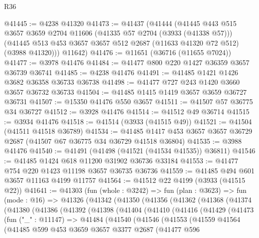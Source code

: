 \begin{lexlean}{R36}
\begin{coremodule}
@41445 := @4238 @41320
@41473 := @41437
    (@41444
      (@41445
        @443
        @515
        @3657
        @3659
        @2704
        @11606
        (@41335 @57 @2704 (@3933 (@41338 @57)))
        (@41445 @513 @453 @3657 @3657 @512 @2687 (@11633 @41320 @72 @512) (@3988 @41320)))
      @11642)
@41476 := @11651 (@36716 (@11655 @7024))
@41477 := @3978 @41476
@41484 := @41477 @800 @220 @1427 @36359 @3657 @36739 @36741
@41485 := @4238 @41476
@41491 := @41485 @1421 @1426 @3682 @36358 @36733 @36738
@41498 := @41477 @727 @243 @1420 @3660 @3657 @36732 @36733
@41504 := @41485 @1415 @1419 @3657 @3659 @36727 @36731
@41507 := @15350 @41476 @550 @3657
@41511 := @41507 @57 @36775 @34 @36727
@41512 := @3928 @41476
@41514 := @41512 @49 @36714
@41515 := @3934 @41476
@41518 := @41514 (@3933 (@41515 @49))
@41521 := @41504 (@41511 @41518 @36789)
@41534 := @41485 @1417 @453 @3657 @3657 @36729 @2687 (@41507 @67 @36775 @34 @36729 @41518 @36804)
@41535 := @3988 @41476
@41540 := @41491 (@41498 (@41521 (@41534 @41535)) @36811)
@41546 := @41485 @1424 @618 @11200 @31902 @36736 @33184
@41553 := @41477 @754 @220 @1423 @11198 @3657 @36735 @36736
@41559 := @41485 @494 @601 @3657 @11163 @4199 @11757
@41564 := @41512 @22 @4199 (@3933 (@41515 @22))
@41641 := @41303
    (fun (whole : @3242) =>
    fun (plan : @3623) =>
    fun (mode : @16) =>
    @41326
      (@41342
        (@41350
          (@41356
            (@41362
              (@41368
                (@41374
                  (@41380
                    (@41386
                      (@41392
                        (@41398
                          (@41404
                            (@41410
                              (@41416
                                (@41429
                                  (@41473
                                    (fun ("_" : @11147) =>
                                    @41484
                                      (@41540
                                        (@41546
                                          (@41553
                                            (@41559
                                              @41564
                                              (@41485
                                                @599
                                                @453
                                                @3659
                                                @3657
                                                @3377
                                                @2687
                                                (@41477
                                                  @596

\end{coremodule}
\end{lexlean}
